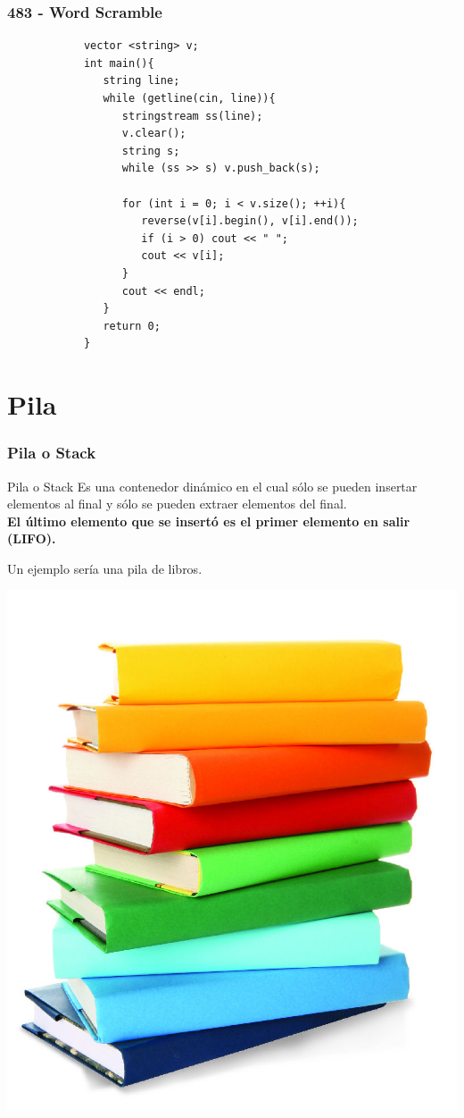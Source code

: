 \documentclass{beamer}
\begin{document}
	\begin{frame}[fragile]
		\frametitle{483 - Word Scramble}
		\begin{lstlisting}
			vector <string> v;
			int main(){
			   string line;
			   while (getline(cin, line)){
			      stringstream ss(line);
			      v.clear();
			      string s;
			      while (ss >> s) v.push_back(s);

			      for (int i = 0; i < v.size(); ++i){
			         reverse(v[i].begin(), v[i].end());
			         if (i > 0) cout << " ";
			         cout << v[i];
			      }
			      cout << endl;
			   }
			   return 0;
			}
		\end{lstlisting}
		
	\end{frame}


\section{Pila}
	\begin{frame}
		\frametitle{Pila o Stack}
		\begin{block}{Pila o Stack}
			Es una contenedor dinámico en el cual sólo se pueden insertar elementos al final y sólo se pueden extraer elementos del final.\\
			\textbf{El último elemento que se insertó es el primer elemento en salir (LIFO).}\\
		\end{block}		
		Un ejemplo sería una pila de libros.\\
		\begin{center}
			\includegraphics[height = 0.35\textheight]{stack_libros.jpg}
		\end{center}
	\end{frame}
	
\end{document}
